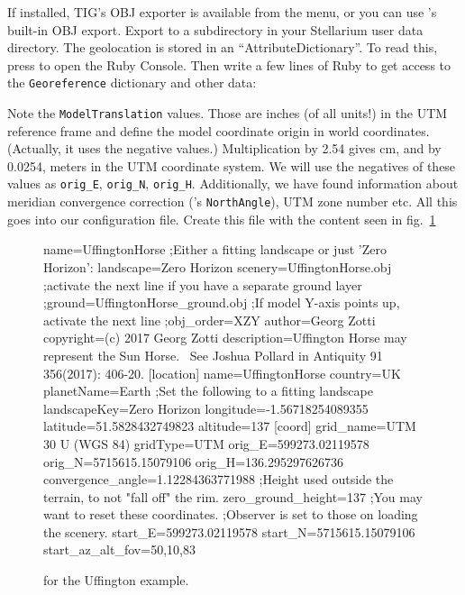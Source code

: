 If installed, TIG's OBJ exporter is available from the  menu, or you can use 's built-in OBJ export. 
Export  to a subdirectory   in your Stellarium user data directory.
The geolocation is stored in an ``AttributeDictionary''. To read this, press  to open the Ruby Console. 
Then write a few lines of Ruby to get access to the \texttt{Georeference} dictionary and other data:
						

Note the \texttt{ModelTranslation} values. Those are inches (of all units!) in the UTM reference frame 
and define the model coordinate origin in world coordinates. (Actually, it uses the negative values.) 
Multiplication by 2.54 gives cm, and by 0.0254, meters in the UTM coordinate system. 
We will use the negatives of these values as \texttt{orig\_E}, \texttt{orig\_N}, \texttt{orig\_H}. 
Additionally, we have found information about meridian convergence correction ('s \texttt{NorthAngle}), 
UTM zone number etc. All this goes into our configuration file. 
Create this file  with the content seen in fig.~\ref{fig:scenery3d:UffingtonIni}
\begin{figure}[p]
\begin{configfile}
[model]
name=UffingtonHorse
;Either a fitting landscape or just 'Zero Horizon':
landscape=Zero Horizon
scenery=UffingtonHorse.obj
;activate the next line if you have a separate ground layer 
;ground=UffingtonHorse_ground.obj
;If model Y-axis points up, activate the next line
;obj_order=XZY
author=Georg Zotti
copyright=(c) 2017 Georg Zotti
description=Uffington Horse may represent the Sun Horse. \
        See Joshua Pollard in Antiquity 91 356(2017): 406-20.
[location]
name=UffingtonHorse
country=UK
planetName=Earth
;Set the following to a fitting landscape
landscapeKey=Zero Horizon
longitude=-1.56718254089355
latitude=51.5828432749823
altitude=137
[coord]
grid_name=UTM 30 U (WGS 84)
gridType=UTM
orig_E=599273.02119578
orig_N=5715615.15079106
orig_H=136.295297626736
convergence_angle=1.12284363771988
;Height used outside the terrain, to not "fall off" the rim.
zero_ground_height=137
;You may want to reset these coordinates. 
;Observer is set to those on loading the scenery.
start_E=599273.02119578
start_N=5715615.15079106
start_az_alt_fov=50,10,83
\end{configfile}
\caption{ for the Uffington example.}
\label{fig:scenery3d:UffingtonIni}
\end{figure}

